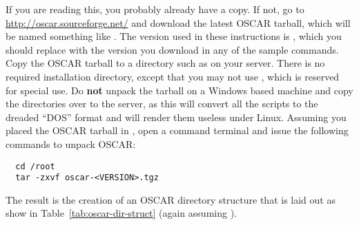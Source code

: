 If you are reading this, you probably already have a copy. If not, go
to \url{http://oscar.sourceforge.net/} and download the latest OSCAR
tarball, which will be named something like .
The version used in these instructions is \oscarversion, which you
should replace with the version you download in any of the sample
\begchange
commands. Copy the OSCAR tarball to a directory such as  on
\endchange
your server. There is no required installation directory, except that
you may not use , which is reserved for special
use. Do {\bf not} unpack the tarball on a Windows based machine and
copy the directories over to the server, as this will convert all the
scripts to the dreaded ``DOS'' format and will render them useless
under Linux.  Assuming you placed the OSCAR tarball in
\begchange
{},
\endchange
open a command terminal and issue the following commands to unpack
OSCAR:

\begchange
\begin{verbatim}
  cd /root
  tar -zxvf oscar-<VERSION>.tgz
\end{verbatim}
\endchange
    
The result is the creation of an OSCAR directory structure that is
laid out as show in Table~\ref{tab:oscar-dir-struct} (again assuming
\begchange
{}).
\endchange

